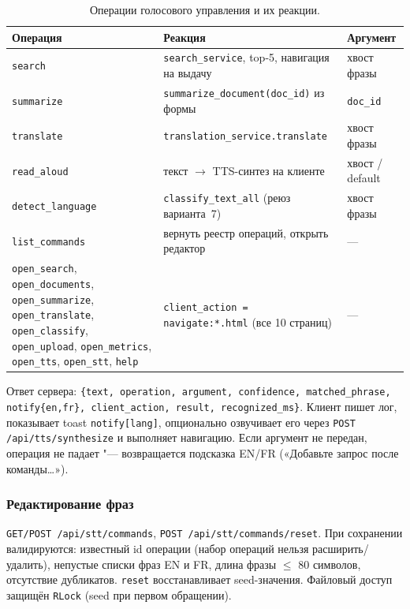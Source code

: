 \begin{table}[H]
	\caption{Операции голосового управления и их реакции.}
	\label{tab:stt_ops}
	\begin{tabular}{|p{}|p{}|p{}|}
		\hline
		Операция & Реакция & Аргумент \\ \hline
		\texttt{search} & \texttt{search\_service}, top-5, навигация на выдачу & хвост фразы \\
		\texttt{summarize} & \texttt{summarize\_document(doc\_id)} из формы & \texttt{doc\_id} \\
		\texttt{translate} & \texttt{translation\_service.translate} & хвост фразы \\
		\texttt{read\_aloud} & текст $\to$ TTS-синтез на клиенте & хвост / default \\
		\texttt{detect\_language} & \texttt{classify\_text\_all} (реюз варианта~7) & хвост фразы \\
		\texttt{list\_commands} & вернуть реестр операций, открыть редактор & --- \\
		\texttt{open\_search}, \texttt{open\_documents}, \texttt{open\_summarize},
		\texttt{open\_translate}, \texttt{open\_classify}, \texttt{open\_upload},
		\texttt{open\_metrics}, \texttt{open\_tts}, \texttt{open\_stt},
		\texttt{help} & \texttt{client\_action = navigate:*.html}
		(все 10 страниц) & --- \\ \hline
	\end{tabular}
\end{table}

Ответ сервера: \texttt{\{text, operation, argument, confidence,
matched\_phrase, notify\{en,fr\}, client\_action, result, recognized\_ms\}}.
Клиент пишет лог, показывает toast \texttt{notify[lang]}, опционально
озвучивает его через \texttt{POST /api/tts/synthesize} и выполняет
навигацию. Если аргумент не передан, операция не падает "--- возвращается
подсказка EN/FR («Добавьте запрос после команды…»).

\subsubsection{Редактирование фраз}

\texttt{GET/POST /api/stt/commands}, \texttt{POST /api/stt/commands/reset}.
При сохранении валидируются: известный id операции (набор операций
нельзя расширить/удалить), непустые списки фраз EN и FR, длина фразы
$\le$ 80 символов, отсутствие дубликатов. \texttt{reset} восстанавливает
seed-значения. Файловый доступ защищён \texttt{RLock} (seed при
первом обращении).

